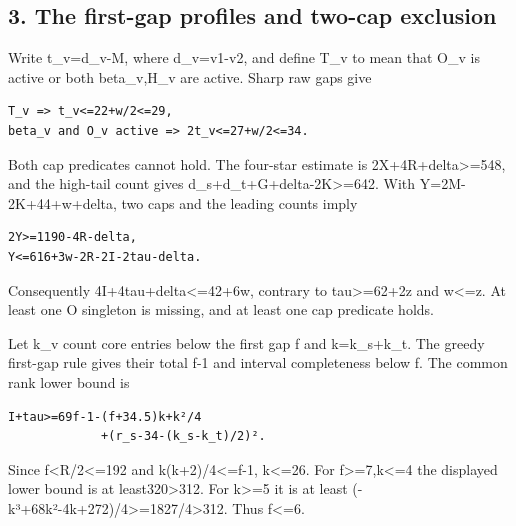 \documentclass[10pt,a4paper]{article}
\theoremstyle{definition}
\begin{document}
\hypertarget{the-first-gap-profiles-and-two-cap-exclusion}{%
\subsection{3. The first-gap profiles and two-cap
exclusion}\label{the-first-gap-profiles-and-two-cap-exclusion}}

Write t\_\allowbreak{}v=\allowbreak{}d\_\allowbreak{}v-M,\allowbreak{} where d\_\allowbreak{}v=\allowbreak{}v1-v2,\allowbreak{} and define T\_\allowbreak{}v to mean that O\_\allowbreak{}v
is active or both beta\_\allowbreak{}v,\allowbreak{}H\_\allowbreak{}v are active. Sharp raw gaps give

\begin{lstlisting}
T_v => t_v<=22+w/2<=29,
beta_v and O_v active => 2t_v<=27+w/2<=34.
\end{lstlisting}

Both cap predicates cannot hold. The four-star estimate is
2X+\allowbreak{}4R+\allowbreak{}delta\textgreater=\allowbreak{}548,\allowbreak{} and the high-tail count gives
d\_\allowbreak{}s+\allowbreak{}d\_\allowbreak{}t+\allowbreak{}G+\allowbreak{}delta-2K\textgreater=\allowbreak{}642. With Y=\allowbreak{}2M-2K+\allowbreak{}44+\allowbreak{}w+\allowbreak{}delta,\allowbreak{} two caps
and the leading counts imply

\begin{lstlisting}
2Y>=1190-4R-delta,
Y<=616+3w-2R-2I-2tau-delta.
\end{lstlisting}

Consequently 4I+\allowbreak{}4tau+\allowbreak{}delta\textless=\allowbreak{}42+\allowbreak{}6w,\allowbreak{} contrary to
tau\textgreater=\allowbreak{}62+\allowbreak{}2z and w\textless=\allowbreak{}z. At least one O singleton is
missing,\allowbreak{} and at least one cap predicate holds.

Let k\_\allowbreak{}v count core entries below the first gap f and k=\allowbreak{}k\_\allowbreak{}s+\allowbreak{}k\_\allowbreak{}t. The
greedy first-gap rule gives their total f-1 and interval completeness
below f. The common rank lower bound is

\begin{lstlisting}
I+tau>=69f-1-(f+34.5)k+k²/4
             +(r_s-34-(k_s-k_t)/2)².
\end{lstlisting}

Since f\textless R/2\textless=\allowbreak{}192 and k(k+\allowbreak{}2)/4\textless=\allowbreak{}f-1,\allowbreak{}
k\textless=\allowbreak{}26. For f\textgreater=\allowbreak{}7,\allowbreak{}k\textless=\allowbreak{}4 the displayed lower
bound is at least320\textgreater312. For k\textgreater=\allowbreak{}5 it is at least
(-k³+\allowbreak{}68k²-4k+\allowbreak{}272)/4\textgreater=\allowbreak{}1827/4\textgreater312. Thus
f\textless=\allowbreak{}6.
\end{document}
